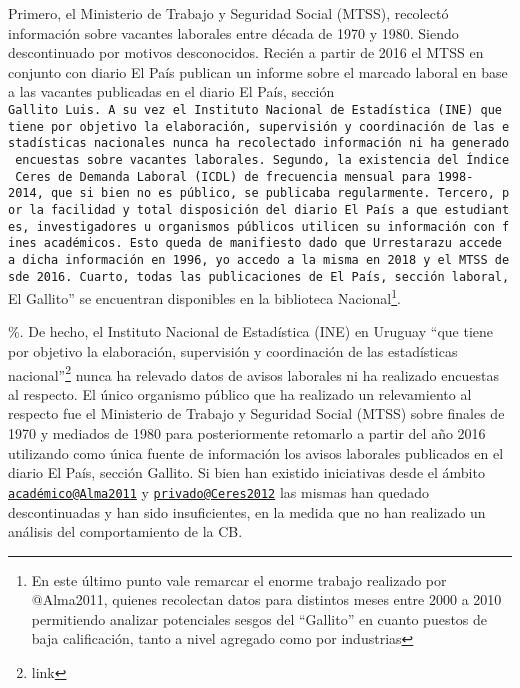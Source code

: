 \documentclass[12pt,twoside]{reedthesis}
\begin{document}
Primero, el Ministerio de Trabajo y Seguridad Social (MTSS), recolectó información sobre vacantes laborales entre década de 1970 y 1980. Siendo descontinuado por motivos desconocidos. Recién a partir de 2016 el MTSS en conjunto con diario El País publican un informe sobre el marcado laboral en base a las vacantes publicadas en el diario El País, sección \texttt{Gallito\ Luis\textquotesingle{}\textquotesingle{}.\ A\ su\ vez\ el\ Instituto\ Nacional\ de\ Estadística\ (INE)\ que\ tiene\ por\ objetivo\ la\ elaboración,\ supervisión\ y\ coordinación\ de\ las\ estadísticas\ nacionales\ nunca\ ha\ recolectado\ información\ ni\ ha\ generado\ encuestas\ sobre\ vacantes\ laborales.\ Segundo,\ la\ existencia\ del\ Índice\ Ceres\ de\ Demanda\ Laboral\ (ICDL)\ de\ frecuencia\ mensual\ para\ 1998-2014,\ que\ si\ bien\ no\ es\ público,\ se\ publicaba\ regularmente.\ Tercero,\ por\ la\ facilidad\ y\ total\ disposición\ del\ diario\ El\ País\ a\ que\ estudiantes,\ investigadores\ u\ organismos\ públicos\ utilicen\ su\ información\ con\ fines\ académicos.\ Esto\ queda\ de\ manifiesto\ dado\ que\ Urrestarazu\ accede\ a\ dicha\ información\ en\ 1996,\ yo\ accedo\ a\ la\ misma\ en\ 2018\ y\ el\ MTSS\ desde\ 2016.\ Cuarto,\ todas\ las\ publicaciones\ de\ El\ País,\ sección\ laboral,}El Gallito'' se encuentran disponibles en la biblioteca Nacional\footnote{En este último punto vale remarcar el enorme trabajo realizado por @Alma2011, quienes recolectan datos para distintos meses entre 2000 a 2010 permitiendo analizar potenciales sesgos del ``Gallito'' en cuanto puestos de baja calificación, tanto a nivel agregado como por industrias}.

\%. De hecho, el Instituto Nacional de Estadística (INE) en Uruguay ``que tiene por objetivo la elaboración, supervisión y coordinación de las estadísticas nacional''\footnote{link} nunca ha relevado datos de avisos laborales ni ha realizado encuestas al respecto. El único organismo público que ha realizado un relevamiento al respecto fue el Ministerio de Trabajo y Seguridad Social (MTSS) sobre finales de 1970 y mediados de 1980 para posteriormente retomarlo a partir del año 2016 utilizando como única fuente de información los avisos laborales publicados en el diario El País, sección Gallito. Si bien han existido iniciativas desde el ámbito \href{mailto:académico@Alma2011}{\nolinkurl{académico@Alma2011}} y \href{mailto:privado@Ceres2012}{\nolinkurl{privado@Ceres2012}} las mismas han quedado descontinuadas y han sido insuficientes, en la medida que no han realizado un análisis del comportamiento de la CB.
\end{document}
